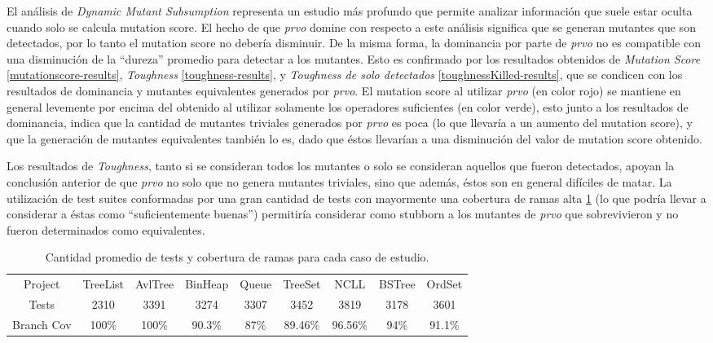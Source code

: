 El an\'alisis de \emph{Dynamic Mutant Subsumption} representa un estudio m\'as profundo que permite analizar informaci\'on que suele estar oculta cuando solo se calcula mutation score. El hecho de que \emph{prvo} domine con respecto a este an\'alisis significa que se generan mutantes que son detectados, por lo tanto el mutation score no deber\'ia disminuir. De la misma forma, la dominancia por parte de \emph{prvo} no es compatible con una disminuci\'on de la ``dureza'' promedio para detectar a los mutantes. Esto es confirmado por los resultados obtenidos de \emph{Mutation Score} \ref{mutationscore-results}, \emph{Toughness} \ref{toughness-results}, y \emph{Toughness de solo detectados} \ref{toughnessKilled-results}, que se condicen con los resultados de dominancia y mutantes equivalentes generados por \emph{prvo}. El mutation score al utilizar \emph{prvo} (en color rojo) se mantiene en general levemente por encima del obtenido al utilizar solamente los operadores suficientes (en color verde), esto junto a los resultados de dominancia, indica que la cantidad de mutantes triviales generados por \emph{prvo} es poca (lo que llevar\'ia a un aumento del mutation score), y que la generaci\'on de mutantes equivalentes tambi\'en lo es, dado que \'estos llevar\'ian a una disminuci\'on del valor de mutation score obtenido.

Los resultados de \emph{Toughness}, tanto si se consideran todos los mutantes o solo se consideran aquellos que fueron detectados, apoyan la conclusi\'on anterior de que \emph{prvo} no solo que no genera mutantes triviales, sino que adem\'as, \'estos son en general dif\'iciles de matar. La utilizaci\'on de test suites conformadas por una gran cantidad de tests con mayormente una cobertura de ramas alta \ref{testsAndCov-results} (lo que podr\'ia llevar a considerar a \'estas como ``suficientemente buenas'') permitir\'ia considerar como stubborn a los mutantes de \emph{prvo} que sobrevivieron y no fueron determinados como equivalentes.

\begin{table}[]
	\centering
	\small
	\def\arraystretch{0.95}
	\setlength\tabcolsep{0.9mm}
	\begin{tabular}{|c|c|c|c|c|c|c|c|c|}
		\hline
		Project & TreeList & AvlTree & BinHeap & Queue & TreeSet & NCLL & BSTree & OrdSet\\ \cline{1-1}
		Tests & 2310 & 3391 & 3274 & 3307 & 3452 & 3819 & 3178 & 3601\\ \cline{1-1}
		Branch Cov & 100\% & 100\% & 90.3\% & 87\% & 89.46\% & 96.56\% & 94\% & 91.1\%\\ \hline
	\end{tabular}
	\caption{Cantidad promedio de tests y cobertura de ramas para cada caso de estudio.}
	\label{testsAndCov-results}
\end{table}

